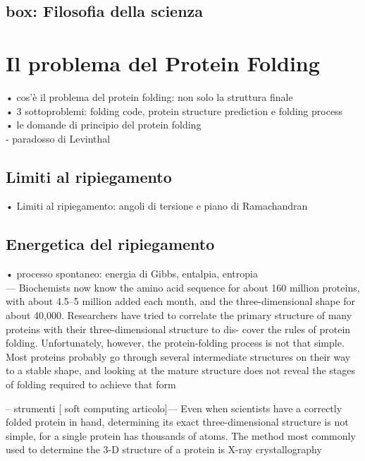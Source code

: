 \subsection{box: Filosofia della scienza}


\section{Il problema del Protein Folding}
• cos’è il problema del protein folding: non solo la struttura finale\\
• 3 sottoproblemi: folding code, protein structure prediction e folding process\\
• le domande di principio del protein folding\\
- paradosso di Levinthal

\subsection{Limiti al ripiegamento}
• Limiti al ripiegamento: angoli di tersione e piano di Ramachandran\\

\subsection{Energetica del ripiegamento}
• processo spontaneo: energia di Gibbs, entalpia, entropia\\


--- Biochemists now know the amino acid sequence for about
160 million proteins, with about 4.5–5 million added each
month, and the three-dimensional shape for about 40,000.
Researchers have tried to correlate the primary structure of
many proteins with their three-dimensional structure to dis-
cover the rules of protein folding. Unfortunately, however,
the protein-folding process is not that simple. Most proteins
probably go through several intermediate structures on their
way to a stable shape, and looking at the mature structure
does not reveal the stages of folding required to achieve that
form

-- strumenti [ soft computing articolo]---
Even when scientists have a correctly folded protein in
hand, determining its exact three-dimensional structure is
not simple, for a single protein has thousands of atoms. The
method most commonly used to determine the 3-D structure
of a protein is X-ray crystallography

